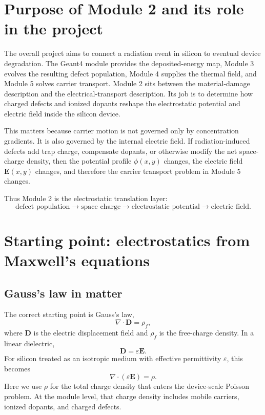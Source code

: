 \documentclass[11pt]{article}
\newcommand{\Evec}{\mathbf{E}}
\newcommand{\Dvec}{\mathbf{D}}
\begin{document}
\section{Purpose of Module 2 and its role in the project}

The overall project aims to connect a radiation event in silicon to eventual device degradation. The Geant4 module provides the deposited-energy map, Module 3 evolves the resulting defect population, Module 4 supplies the thermal field, and Module 5 solves carrier transport. Module 2 sits between the material-damage description and the electrical-transport description. Its job is to determine how charged defects and ionized dopants reshape the electrostatic potential and electric field inside the silicon device.

This matters because carrier motion is not governed only by concentration gradients. It is also governed by the internal electric field. If radiation-induced defects add trap charge, compensate dopants, or otherwise modify the net space-charge density, then the potential profile $\phi(x,y)$ changes, the electric field $\Evec(x,y)$ changes, and therefore the carrier transport problem in Module 5 changes.

Thus Module 2 is the electrostatic translation layer:
\begin{equation}
\text{defect population} \longrightarrow \text{space charge} \longrightarrow \text{electrostatic potential} \longrightarrow \text{electric field}.
\end{equation}

\section{Starting point: electrostatics from Maxwell's equations}

\subsection{Gauss's law in matter}

The correct starting point is Gauss's law,
\begin{equation}
\nabla \cdot \Dvec = \rho_f,
\end{equation}
where $\Dvec$ is the electric displacement field and $\rho_f$ is the free-charge density. In a linear dielectric,
\begin{equation}
\Dvec = \varepsilon \Evec.
\end{equation}
For silicon treated as an isotropic medium with effective permittivity $\varepsilon$, this becomes
\begin{equation}
\nabla \cdot (\varepsilon \Evec) = \rho.
\end{equation}
Here we use $\rho$ for the total charge density that enters the device-scale Poisson problem. At the module level, that charge density includes mobile carriers, ionized dopants, and charged defects.
\end{document}

